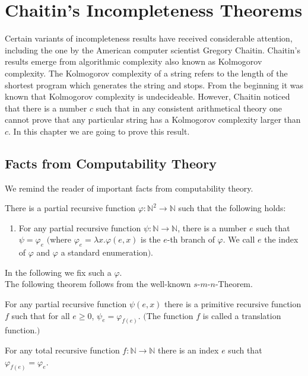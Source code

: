 \chapter{Chaitin's Incompleteness Theorems}

Certain variants of incompleteness results have received considerable attention, including the one by the American computer scientist Gregory Chaitin. Chaitin's results emerge from algorithmic complexity also known as Kolmogorov complexity. The Kolmogorov complexity of a string refers to the length of the shortest program which generates the string and stops. From the beginning it was known that Kolmogorov complexity is undecideable. However, Chaitin noticed that there is a number $c$ such that in any consistent arithmetical theory one cannot prove that any particular string has a Kolmogorov complexity larger than $c$. In this chapter we are going to prove this result.
\section{Facts from Computability Theory}
We remind the reader of important facts from computability theory. 
\begin{thm}
There is a partial recursive function $\varphi: \mathbb{N}^2 \rightarrow \mathbb{N}$ such that the following holds:
\begin{enumerate}
\item For any partial recursive function $\psi: \mathbb{N} \rightarrow \mathbb{N}$, there is a number $e$ such that $\psi = \varphi_e$ $($where $\varphi_e = \lambda x. \varphi(e,x)$ is the $e$-th branch of $\varphi$. We call $e$ the index of $\varphi$ and $\varphi$ a standard enumeration$)$. 
\end{enumerate}
\end{thm}

In the following we fix such a $\varphi$.
\\

The following theorem follows from the well-known $s$-$m$-$n$-Theorem. 
\begin{thm}\label{thm:translationfunction}
For any partial recursive function $\psi(e,x)$ there is a primitive recursive function $f$ such that for all $e \ge 0$, $\psi_e = \varphi_{f(e)}$. $($The function $f$ is called a translation function.$)$
\end{thm}


\begin{thm}
For any total recursive function $f: \mathbb{N} \rightarrow \mathbb{N}$ there is an index $e$ such that $\varphi_{f(e)} = \varphi_e$.
\end{thm}


